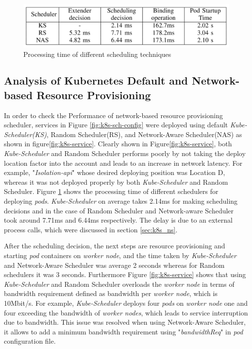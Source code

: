   \begin{figure}
    \centering
    \includegraphics[width=\linewidth]{figures/mlcn-k8s-exec-time.pdf}
    \caption{Processing time of different scheduling techniques\cite{Santos2019}}
    \label{fig:k8s-exec-t}
  \end{figure}
  \vspace{-0.5cm}
  \subsection{Analysis of Kubernetes Default and Network-based Resource Provisioning}
  \label{sec:analysis}
  In order to check the Performance of network-based resource provisioning scheduler, services in Figure \ref{fig:k8s-sch-config} were deployed using default \emph{Kube-Scheduler(KS)}, Random Scheduler(RS), and Network-Aware Scheduler(NAS) as shown in figure\ref{fig:k8s-service}\cite{Santos2019}. Clearly shown in Figure\ref{fig:k8s-service}, both \emph{Kube-Scheduler} and Random Scheduler performs poorly by not taking the deploy location factor into the account and leads to an increase in network latency\cite{Santos2019}. For example, "\emph{Isolation-api}" whose desired deploying position was Location D, whereas it was not deployed properly by both \emph{Kube-Scheduler} and Random Scheduler\cite{Santos2019}. Figure \ref{fig:k8s-exec-t} shows the processing time of different schedulers for deploying \emph{pods}. \emph{Kube-Scheduler} on average takes 2.14ms for making scheduling decisions and in the case of Random Scheduler and Network-aware Scheduler took around 7.71ms and 6.44ms respectively\cite{Santos2019}. The delay is due to an external process calls, which were discussed in section \ref{sec:k8s_ns}.\par 
  After the scheduling decision, the next steps are resource provisioning and starting \emph{pod} containers on \emph{worker node}, and the time taken by \emph{Kube-Scheduler} and Network-Aware Scheduler was average 2 seconds whereas for Random schedulers it was 3 seconds\cite{Santos2019}. Furthermore Figure \ref{fig:k8s-service} shows that using \emph{Kube-Scheduler} and Random Scheduler overloads the \emph{worker node} in terms of bandwidth requirement defined as bandwidth per \emph{worker node}, which is 10Mbit/s\cite{Santos2019}. For example, \emph{Kube-Scheduler} deploys four \emph{pods} on \emph{worker node} one and four exceeding the bandwidth of \emph{worker nodes}, which leads to service interruption due to bandwidth\cite{Santos2019}. This issue was resolved when using Network-Aware Scheduler, it allows to add a minimum bandwidth requirement using "\emph{bandwidthReq}" in \emph{pod} configuration file\cite{Santos2019}. \par
